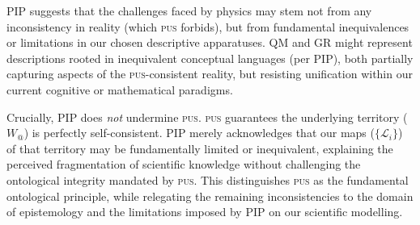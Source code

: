 \documentclass[11pt, a4paper]{article}
\makeatletter
\newcommand{\pus}{\textsc{pus}} %
\newcommand{\Wactual}{W_{@}} %
\newcommand{\LangSet}{\{\mathcal{L}_i\}} %
\makeatother
\begin{document}
PIP suggests that the challenges faced by physics may stem not from any inconsistency in reality (which \pus{} forbids), but from fundamental inequivalences or limitations in our chosen descriptive apparatuses. QM and GR might represent descriptions rooted in inequivalent conceptual languages (per PIP), both partially capturing aspects of the \pus-consistent reality, but resisting unification within our current cognitive or mathematical paradigms.

Crucially, PIP does \textit{not} undermine \pus. \pus{} guarantees the underlying territory ($\Wactual$) is perfectly self-consistent. PIP merely acknowledges that our maps ($\LangSet$) of that territory may be fundamentally limited or inequivalent, explaining the perceived fragmentation of scientific knowledge without challenging the ontological integrity mandated by \pus. This distinguishes \pus{} as the fundamental ontological principle, while relegating the remaining inconsistencies to the domain of epistemology and the limitations imposed by PIP on our scientific modelling.
\end{document}

